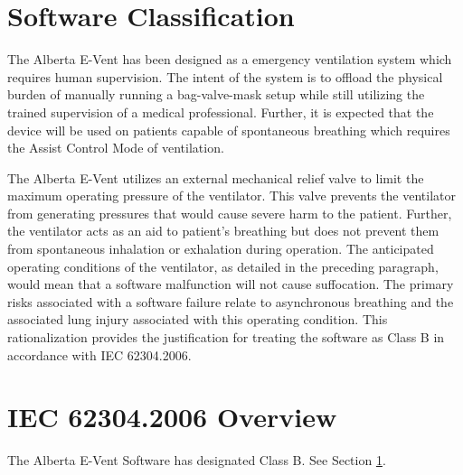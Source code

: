 \documentclass[]{article}
\begin{document}
\clearpage

\section{Software Classification}
\label{sect:software_class}
The Alberta E-Vent has been designed as a emergency ventilation system which requires human supervision. The intent of the system is to offload the physical burden of manually running a bag-valve-mask setup while still utilizing the trained supervision of a medical professional. Further, it is expected that the device will be used on patients capable of spontaneous breathing which requires the Assist Control Mode of ventilation.

The Alberta E-Vent utilizes an external mechanical relief valve to limit the maximum operating pressure of the ventilator.  This valve prevents the ventilator from generating pressures that would cause severe harm to the patient.  Further, the ventilator acts as an aid to patient's breathing but does not prevent them from spontaneous inhalation or exhalation during operation.  The anticipated operating conditions of the ventilator, as detailed in the preceding paragraph, would mean that a software malfunction will not cause suffocation.  The primary risks associated with a software failure relate to asynchronous breathing and the associated lung injury associated with this operating condition.  This rationalization provides the justification for treating the software as Class B in accordance with IEC 62304.2006.

\clearpage


\section{IEC 62304.2006 Overview}

The Alberta E-Vent Software has designated Class B. See Section \ref{sect:software_class}.
\end{document}
